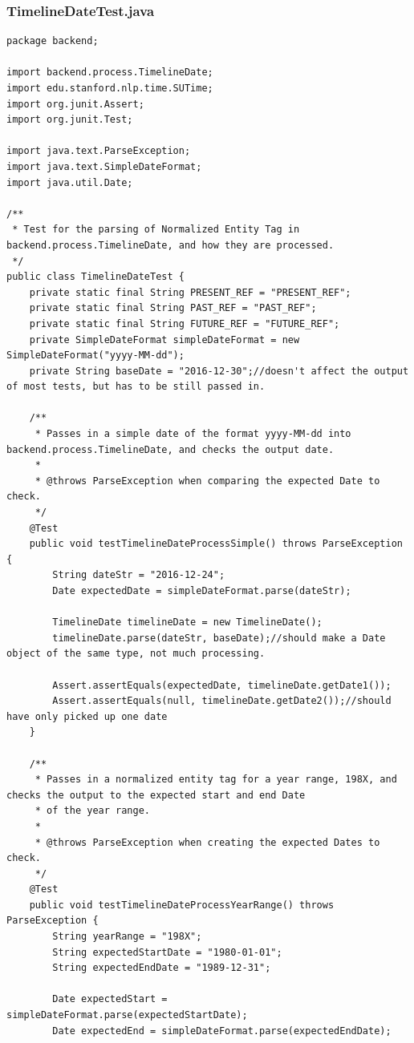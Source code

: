 \subsubsection{TimelineDateTest.java}
\begin{lstlisting}
package backend;

import backend.process.TimelineDate;
import edu.stanford.nlp.time.SUTime;
import org.junit.Assert;
import org.junit.Test;

import java.text.ParseException;
import java.text.SimpleDateFormat;
import java.util.Date;

/**
 * Test for the parsing of Normalized Entity Tag in backend.process.TimelineDate, and how they are processed.
 */
public class TimelineDateTest {
    private static final String PRESENT_REF = "PRESENT_REF";
    private static final String PAST_REF = "PAST_REF";
    private static final String FUTURE_REF = "FUTURE_REF";
    private SimpleDateFormat simpleDateFormat = new SimpleDateFormat("yyyy-MM-dd");
    private String baseDate = "2016-12-30";//doesn't affect the output of most tests, but has to be still passed in.

    /**
     * Passes in a simple date of the format yyyy-MM-dd into backend.process.TimelineDate, and checks the output date.
     *
     * @throws ParseException when comparing the expected Date to check.
     */
    @Test
    public void testTimelineDateProcessSimple() throws ParseException {
        String dateStr = "2016-12-24";
        Date expectedDate = simpleDateFormat.parse(dateStr);

        TimelineDate timelineDate = new TimelineDate();
        timelineDate.parse(dateStr, baseDate);//should make a Date object of the same type, not much processing.

        Assert.assertEquals(expectedDate, timelineDate.getDate1());
        Assert.assertEquals(null, timelineDate.getDate2());//should have only picked up one date
    }

    /**
     * Passes in a normalized entity tag for a year range, 198X, and checks the output to the expected start and end Date
     * of the year range.
     *
     * @throws ParseException when creating the expected Dates to check.
     */
    @Test
    public void testTimelineDateProcessYearRange() throws ParseException {
        String yearRange = "198X";
        String expectedStartDate = "1980-01-01";
        String expectedEndDate = "1989-12-31";

        Date expectedStart = simpleDateFormat.parse(expectedStartDate);
        Date expectedEnd = simpleDateFormat.parse(expectedEndDate);


\end{lstlisting}
